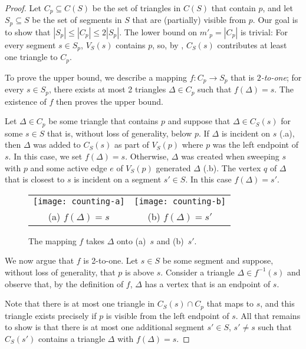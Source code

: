 \documentclass{patmorin}
\begin{document}
\begin{proof}
Let $C_p\subseteq C(S)$ be the set of triangles in $C(S)$ that contain
$p$, and let $S_p\subseteq S$ be the set of segments in $S$ that are
(partially) visible from $p$.  Our goal is to show that $|S_p|\le |C_p|\le
2|S_p|$. The lower bound on $m'_p=|C_p|$ is trivial: For every segment
$s\in S_p$, $V_S(s)$ contains $p$, so, by , $C_S(s)$
contributes at least one triangle to $C_p$.

To prove the upper bound, we describe a mapping $f: C_p \rightarrow S_p$
that is \emph{$2$-to-one}; for every $s\in S_p$, there exists at most 2
triangles $\Delta\in C_p$ such that $f(\Delta)=s$. The existence of $f$
then proves the upper bound.

Let $\Delta\in C_p$ be some triangle that contains $p$ and suppose that
$\Delta\in C_S(s)$ for some $s\in S$ that is, without loss of generality,
below $p$.  If $\Delta$ is incident on $s$ (.a), then $\Delta$ was added to
$C_S(s)$ as part of $V_S(p)$ where $p$ was the left endpoint of $s$.  In
this case, we set $f(\Delta)=s$.  Otherwise, $\Delta$ was created when
sweeping $s$ with $p$ and some active edge $e$ of $V_S(p)$ generated
$\Delta$ (.b).  The vertex $q$ of $\Delta$ that is closest to $s$ is incident on a
segment $s'\in S$.  In this case $f(\Delta)=s'$.

\begin{figure}
  \begin{center}
    \begin{tabular}{cc}
      \texttt{[image: counting-a]} &
      \texttt{[image: counting-b]} \\
      (a) $f(\Delta)=s$ & (b) $f(\Delta)=s'$
    \end{tabular}
  \end{center}
  \caption{The mapping $f$ takes $\Delta$ onto (a)~$s$ and (b)~$s'$.}
\end{figure}

We now argue that $f$ is 2-to-one.  Let $s\in S$ be some segment and
suppose, without loss of generality, that $p$ is above $s$.  Consider a
triangle $\Delta \in f^{-1}(s)$ and observe that, by the definition of $f$,
$\Delta$ has a vertex that is an endpoint of $s$.

Note that there is at most one triangle in $C_S(s)\cap C_p$ that maps
to $s$, and this triangle exists precisely if $p$ is visible from the
left endpoint of $s$.  All that remains to show is that there is at
most one additional segment $s'\in S$, $s'\neq s$ such that $C_S(s')$
contains a triangle $\Delta$ with $f(\Delta)=s$.


\end{proof}
\end{document}

